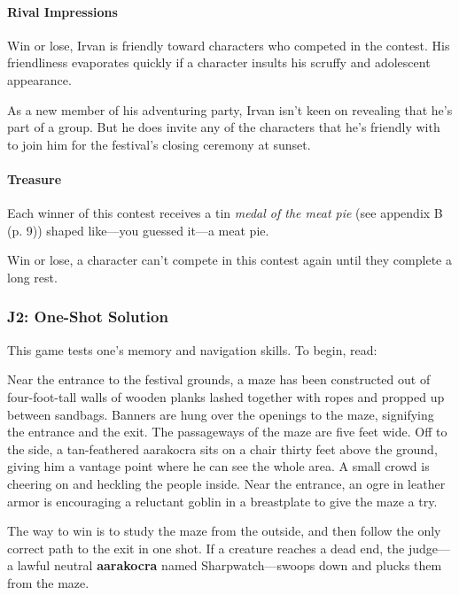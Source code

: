 \documentclass[letterpaper, 11pt, bg=full, twocolumn]{dndbook}
\begin{document}
\paragraph{Rival Impressions}

Win or lose, Irvan is friendly toward characters who competed in the contest. His friendliness evaporates quickly if a character insults his scruffy and adolescent appearance.

As a new member of his adventuring party, Irvan isn't keen on revealing that he's part of a group. But he does invite any of the characters that he's friendly with to join him for the festival's closing ceremony at sunset.

\paragraph{Treasure}

Each winner of this contest receives a tin \textit{medal of the meat pie} (see appendix B (p. 9)) shaped like---you guessed it---a meat pie.

Win or lose, a character can't compete in this contest again until they complete a long rest.


\subsubsection{J2: One-Shot Solution}

This game tests one's memory and navigation skills. To begin, read:

\begin{DndReadAloud}
Near the entrance to the festival grounds, a maze has been constructed out of four-foot-tall walls of wooden planks lashed together with ropes and propped up between sandbags. Banners are hung over the openings to the maze, signifying the entrance and the exit. The passageways of the maze are five feet wide. Off to the side, a tan-feathered aarakocra sits on a chair thirty feet above the ground, giving him a vantage point where he can see the whole area.
A small crowd is cheering on and heckling the people inside. Near the entrance, an ogre in leather armor is encouraging a reluctant goblin in a breastplate to give the maze a try.
\end{DndReadAloud}

The way to win is to study the maze from the outside, and then follow the only correct path to the exit in one shot. If a creature reaches a dead end, the judge---a lawful neutral \textbf{aarakocra} named Sharpwatch---swoops down and plucks them from the maze.
\end{document}
